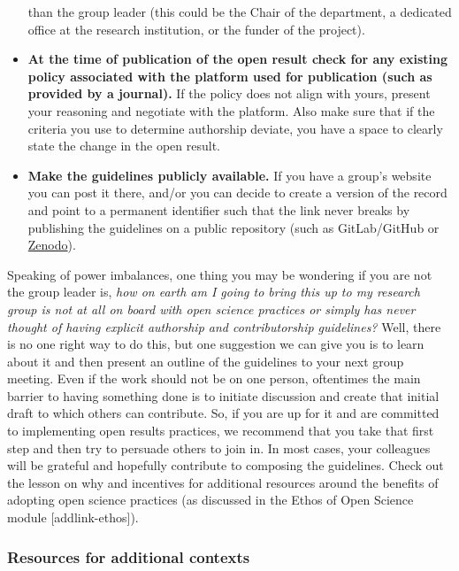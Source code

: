 \documentclass[
  letterpaper,
  DIV=11,
  numbers=noendperiod]{scrreport}
\begin{document}
\begin{itemize}
  than the group leader (this could be the Chair of the department, a
  dedicated office at the research institution, or the funder of the
  project).
\item
  \textbf{At the time of publication of the open result check for any
  existing policy associated with the platform used for publication
  (such as provided by a journal).} If the policy does not align with
  yours, present your reasoning and negotiate with the platform. Also
  make sure that if the criteria you use to determine authorship
  deviate, you have a space to clearly state the change in the open
  result.
\item
  \textbf{Make the guidelines publicly available.} If you have a group's
  website you can post it there, and/or you can decide to create a
  version of the record and point to a permanent identifier such that
  the link never breaks by publishing the guidelines on a public
  repository (such as GitLab/GitHub or
  \href{https://zenodo.org/}{Zenodo}).
\end{itemize}

Speaking of power imbalances, one thing you may be wondering if you are
not the group leader is, \emph{how on earth am I going to bring this up
to my research group is not at all on board with open science practices
or simply has never thought of having explicit authorship and
contributorship guidelines?} Well, there is no one right way to do this,
but one suggestion we can give you is to learn about it and then present
an outline of the guidelines to your next group meeting. Even if the
work should not be on one person, oftentimes the main barrier to having
something done is to initiate discussion and create that initial draft
to which others can contribute. So, if you are up for it and are
committed to implementing open results practices, we recommend that you
take that first step and then try to persuade others to join in. In most
cases, your colleagues will be grateful and hopefully contribute to
composing the guidelines. Check out the lesson on why and incentives for
additional resources around the benefits of adopting open science
practices (as discussed in the Ethos of Open Science module
{[}addlink-ethos{]}).

\hypertarget{resources-for-additional-contexts}{%
\subsubsection{Resources for additional
contexts}\label{resources-for-additional-contexts}}
\end{document}

